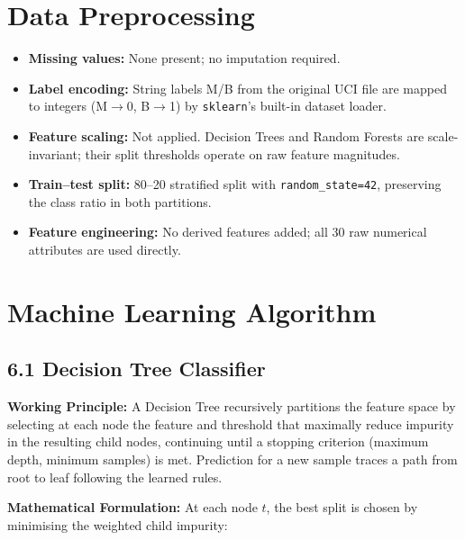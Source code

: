 \documentclass[12pt,a4paper]{article}
\begin{document}
\section{Data Preprocessing}

\begin{itemize}[noitemsep]
  \item \textbf{Missing values:} None present; no imputation required.
  \item \textbf{Label encoding:} String labels M/B from the original UCI file are mapped to
        integers (M$\rightarrow$0, B$\rightarrow$1) by \texttt{sklearn}'s built-in dataset loader.
  \item \textbf{Feature scaling:} Not applied. Decision Trees and Random Forests are
        scale-invariant; their split thresholds operate on raw feature magnitudes.
  \item \textbf{Train--test split:} 80--20 stratified split with \texttt{random\_state=42},
        preserving the class ratio in both partitions.
  \item \textbf{Feature engineering:} No derived features added; all 30 raw numerical attributes
        are used directly.
\end{itemize}

\section{Machine Learning Algorithm}

\subsection*{6.1 Decision Tree Classifier}

\textbf{Working Principle:}
A Decision Tree recursively partitions the feature space by selecting at each node the feature and
threshold that maximally reduce impurity in the resulting child nodes, continuing until a stopping
criterion (maximum depth, minimum samples) is met. Prediction for a new sample traces a path from
root to leaf following the learned rules.

\textbf{Mathematical Formulation:}
At each node $t$, the best split is chosen by minimising the weighted child impurity:
\end{document}
